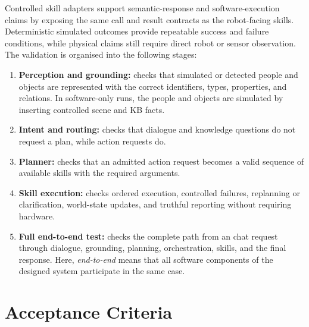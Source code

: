 Controlled skill adapters support semantic-response and software-execution claims by exposing the same call and result contracts as the robot-facing skills. Deterministic simulated outcomes provide repeatable success and failure conditions, while physical claims still require direct robot or sensor observation. The validation is organised into the following stages:

\begin{enumerate}
  \item \textbf{Perception and grounding:} checks that simulated or detected people and objects are represented with the correct identifiers, types, properties, and relations. In software-only runs, the people and objects are simulated by inserting controlled scene and KB facts.
  \item \textbf{Intent and routing:} checks that dialogue and knowledge questions do not request a plan, while action requests do.
  \item \textbf{Planner:} checks that an admitted action request becomes a valid sequence of available skills with the required arguments.
  \item \textbf{Skill execution:} checks ordered execution, controlled failures, replanning or clarification, world-state updates, and truthful reporting without requiring hardware.
  \item \textbf{Full end-to-end test:} checks the complete path from an  chat request through dialogue, grounding, planning, orchestration, skills, and the final response. Here, \emph{end-to-end} means that all software components of the designed system participate in the same case.
\end{enumerate}

\section{Acceptance Criteria}

